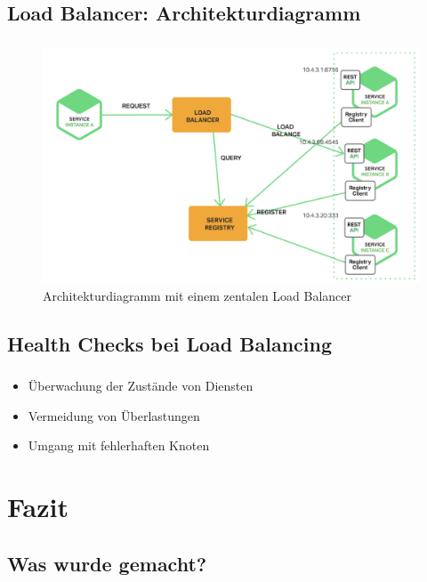 \subsection{Load Balancer: Architekturdiagramm}
\begin{frame}
    \frametitle{\insertsection}
    \framesubtitle{\insertsubsection}

    \begin{figure}[h]
        \centering
        \includegraphics[height=0.5\textheight]{../images/loadbalancer}
        \caption{Architekturdiagramm mit einem zentalen Load Balancer}
    \end{figure}
\end{frame}

\subsection{Health Checks bei Load Balancing}
\begin{frame}
    \frametitle{\insertsection}
    \framesubtitle{\insertsubsection}

    \begin{itemize}
        \item Überwachung der Zustände von Diensten
        \item Vermeidung von Überlastungen
        \item Umgang mit fehlerhaften Knoten
    \end{itemize}
\end{frame}

\section{Fazit}
\subsection{Was wurde gemacht?}

